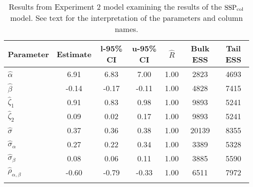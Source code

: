 \begin{table}

\caption{Results from Experiment 2 model examining the results of the $\operatorname{SSP}_{\text{col}}$ model. \label{tab:Experiment 2-SSPobs}See text for the interpretation of the parameters and column names.}

\begin{tabular}{l *3{S[table-format=-1.2]} S[table-format=1.2] *2{S[table-format=5.0]}}
\lsptoprule
Parameter & {Estimate} & {l-95\% CI} & {u-95\% CI} & {$\hat{R}$} & {Bulk ESS} & {Tail ESS}\\
\midrule
$\hat\alpha$ & 6.91 & 6.83 & 7.00 & 1.00 & 2823 & 4693\\
$\hat\beta$ & -0.14 & -0.17 & -0.11 & 1.00 & 4828 & 7415\\
$\hat\zeta_{1}$ & 0.91 & 0.83 & 0.98 & 1.00 & 9893 & 5241\\
$\hat\zeta_{2}$ & 0.09 & 0.02 & 0.17 & 1.00 & 9893 & 5241\\
$\hat\sigma$ & 0.37 & 0.36 & 0.38 & 1.00 & 20139 & 8355\\
$\hat\sigma_{\alpha}$ & 0.27 & 0.22 & 0.34 & 1.00 & 3389 & 5328\\
$\hat\sigma_{\beta}$ & 0.08 & 0.06 & 0.11 & 1.00 & 3885 & 5590\\
$\hat\rho_{\alpha,\beta}$ & -0.60 & -0.79 & -0.33 & 1.00 & 6511 & 7972\\
\lspbottomrule
\end{tabular}

\end{table}






